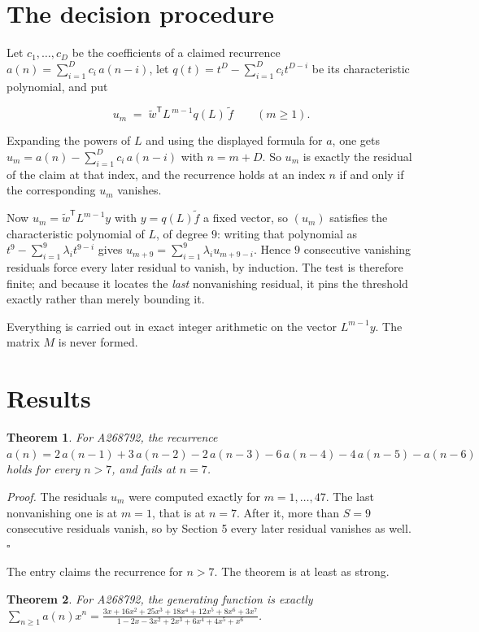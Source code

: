 \documentclass[11pt]{article}
\newtheorem{theorem}{Theorem}
\theoremstyle{definition}
\begin{document}
\section{The decision procedure}

Let $c_1,\dots,c_D$ be the coefficients of a claimed recurrence $a(n) = \sum_{i=1}^{D} c_i\,a(n-i)$, let $q(t) = t^{D} - \sum_{i=1}^{D} c_i t^{D-i}$ be its characteristic polynomial, and put

\[u_m \;=\; \tilde w^{\mathsf T} L^{\,m-1} q(L)\,\tilde f \qquad (m \ge 1).\]

Expanding the powers of $L$ and using the displayed formula for $a$, one gets $u_m = a(n) - \sum_{i=1}^{D} c_i\,a(n-i)$ with $n = m + D$. So $u_m$ is exactly the residual of the claim at that index, and the recurrence holds at an index $n$ if and only if the corresponding $u_m$ vanishes.

Now $u_m = \tilde w^{\mathsf T} L^{m-1} y$ with $y = q(L)\tilde f$ a fixed vector, so $(u_m)$ satisfies the characteristic polynomial of $L$, of degree $9$: writing that polynomial as $t^{9} - \sum_{i=1}^{9} \lambda_i t^{9-i}$ gives $u_{m+9} = \sum_{i=1}^{9} \lambda_i u_{m+9-i}$. Hence $9$ consecutive vanishing residuals force every later residual to vanish, by induction. The test is therefore finite; and because it locates the {\itshape last} nonvanishing residual, it pins the threshold exactly rather than merely bounding it.

Everything is carried out in exact integer arithmetic on the vector $L^{m-1}y$. The matrix $M$ is never formed.

\section{Results}

\begin{theorem} For A268792, the recurrence $a(n) = 2\,a(n-1) + 3\,a(n-2) - 2\,a(n-3) - 6\,a(n-4) - 4\,a(n-5) - a(n-6)$ holds for every $n > 7$, and fails at $n = 7$.\end{theorem}

{\itshape Proof.} The residuals $u_m$ were computed exactly for $m = 1,\dots,47$. The last nonvanishing one is at $m = 1$, that is at $n = 7$. After it, more than $S = 9$ consecutive residuals vanish, so by Section 5 every later residual vanishes as well. $\square$

The entry claims the recurrence for $n > 7$. The theorem is at least as strong.

\begin{theorem} For A268792, the generating function is exactly $\sum_{n\ge 1} a(n)x^n = \frac{3x + 16x^{2} + 25x^{3} + 18x^{4} + 12x^{5} + 8x^{6} + 3x^{7}}{1 - 2x - 3x^{2} + 2x^{3} + 6x^{4} + 4x^{5} + x^{6}}$.\end{theorem}
\end{document}
